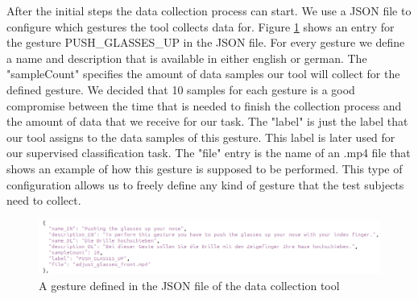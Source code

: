 \documentclass[runningheads]{llncs}
\begin{document}
\par
After the initial steps the data collection process can start. We use a JSON file to configure which gestures the tool collects data for. Figure \ref{fig:gesturejson} shows an entry for the gesture PUSH\_GLASSES\_UP in the JSON file. For every gesture we define a name and description that is available in either english or german. The "sampleCount" specifies the amount of data samples our tool will collect for the defined gesture. We decided that 10 samples for each gesture is a good compromise between the time that is needed to finish the collection process and the amount of data that we receive for our task. The "label" is just the label that our tool assigns to the data samples of this gesture. This label is later used for our supervised classification task. The "file" entry is the name of an .mp4 file that shows an example of how this gesture is supposed to be performed. This type of configuration allows us to freely define any kind of gesture that the test subjects need to collect.
\begin{center}
\begin{figure}
\centerline{\includegraphics[width=\textwidth]{GestureJSON.png}}
\caption{A gesture defined in the JSON file of the data collection tool}
\label{fig:gesturejson}
\end{figure}
\end{center}
\end{document}
